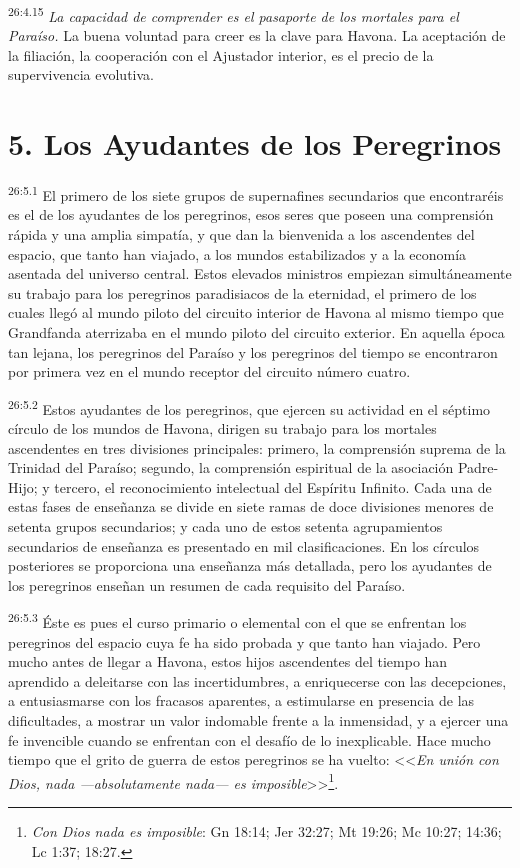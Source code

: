 \par
\textsuperscript{26:4.15} \textit{La capacidad de comprender es el pasaporte de los mortales para el Paraíso.} La buena voluntad para creer es la clave para Havona. La aceptación de la filiación, la cooperación con el Ajustador interior, es el precio de la supervivencia evolutiva.

\section*{5. Los Ayudantes de los Peregrinos}
\par
\textsuperscript{26:5.1} El primero de los siete grupos de supernafines secundarios que encontraréis es el de los ayudantes de los peregrinos, esos seres que poseen una comprensión rápida y una amplia simpatía, y que dan la bienvenida a los ascendentes del espacio, que tanto han viajado, a los mundos estabilizados y a la economía asentada del universo central. Estos elevados ministros empiezan simultáneamente su trabajo para los peregrinos paradisiacos de la eternidad, el primero de los cuales llegó al mundo piloto del circuito interior de Havona al mismo tiempo que Grandfanda aterrizaba en el mundo piloto del circuito exterior. En aquella época tan lejana, los peregrinos del Paraíso y los peregrinos del tiempo se encontraron por primera vez en el mundo receptor del circuito número cuatro.

\par
\textsuperscript{26:5.2} Estos ayudantes de los peregrinos, que ejercen su actividad en el séptimo círculo de los mundos de Havona, dirigen su trabajo para los mortales ascendentes en tres divisiones principales: primero, la comprensión suprema de la Trinidad del Paraíso; segundo, la comprensión espiritual de la asociación Padre-Hijo; y tercero, el reconocimiento intelectual del Espíritu Infinito. Cada una de estas fases de enseñanza se divide en siete ramas de doce divisiones menores de setenta grupos secundarios; y cada uno de estos setenta agrupamientos secundarios de enseñanza es presentado en mil clasificaciones. En los círculos posteriores se proporciona una enseñanza más detallada, pero los ayudantes de los peregrinos enseñan un resumen de cada requisito del Paraíso.

\par
\textsuperscript{26:5.3} Éste es pues el curso primario o elemental con el que se enfrentan los peregrinos del espacio cuya fe ha sido probada y que tanto han viajado. Pero mucho antes de llegar a Havona, estos hijos ascendentes del tiempo han aprendido a deleitarse con las incertidumbres, a enriquecerse con las decepciones, a entusiasmarse con los fracasos aparentes, a estimularse en presencia de las dificultades, a mostrar un valor indomable frente a la inmensidad, y a ejercer una fe invencible cuando se enfrentan con el desafío de lo inexplicable. Hace mucho tiempo que el grito de guerra de estos peregrinos se ha vuelto: <<\textit{En unión con Dios, nada ---absolutamente nada--- es imposible}>>\footnote{\textit{Con Dios nada es imposible}: Gn 18:14; Jer 32:27; Mt 19:26; Mc 10:27; 14:36; Lc 1:37; 18:27.}.

